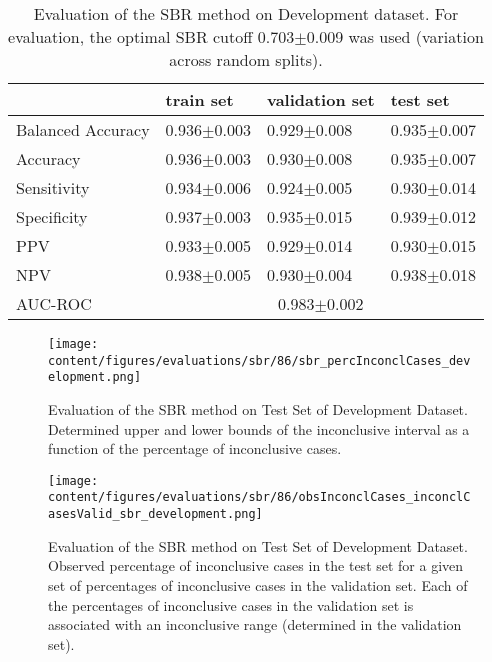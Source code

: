 \begin{table}[ht]
  \caption{Evaluation of the SBR method on Development dataset. 
  For evaluation, the optimal SBR cutoff 0.703$\pm$0.009 was used (variation across random splits).}
  \centering
  \begin{tabular}{llll}
      \hline
                        & train set         & validation set      & test set             \\
      \hline
      Balanced Accuracy & 0.936$\pm$0.003   &   0.929$\pm$0.008   &  0.935$\pm$0.007     \\
      Accuracy          & 0.936$\pm$0.003   &   0.930$\pm$0.008   &  0.935$\pm$0.007     \\
      Sensitivity       &  0.934$\pm$0.006  &   0.924$\pm$0.005   &  0.930$\pm$0.014     \\
      Specificity       & 0.937$\pm$0.003   &   0.935$\pm$0.015   &  0.939$\pm$0.012     \\
      PPV               &  0.933$\pm$0.005  &   0.929$\pm$0.014   &  0.930$\pm$0.015     \\
      NPV               &  0.938$\pm$0.005  &   0.930$\pm$0.004   &  0.938$\pm$0.018     \\
      \hline
      AUC-ROC          &  \multicolumn{3}{c}{0.983$\pm$0.002 }  \\
      \hline
  \end{tabular}
 \label{t1:sbr_perf_eval_table}
\end{table}

\begin{figure}[t]
    \centering
    \texttt{[image: content/figures/evaluations/sbr/86/sbr\_percInconclCases\_development.png]}
    \caption{Evaluation of the SBR method on Test Set of Development Dataset. 
    Determined upper and lower bounds of the inconclusive interval as a function of the percentage of inconclusive cases.} 
    \label{fig:sbr_percInconclCases_development}
\end{figure}


\begin{figure}[h]
    \centering
    \texttt{[image: content/figures/evaluations/sbr/86/obsInconclCases\_inconclCasesValid\_sbr\_development.png]}
    \caption{Evaluation of the SBR method on Test Set of Development Dataset.
    Observed percentage of inconclusive cases in the test set 
    for a given set of percentages of inconclusive cases in the validation set.
    Each of the percentages of inconclusive cases in the validation set is associated 
    with an inconclusive range (determined in the validation set).} 
    \label{fig:obsInconclCases_inconclCasesValid_sbr_development}
\end{figure} 


